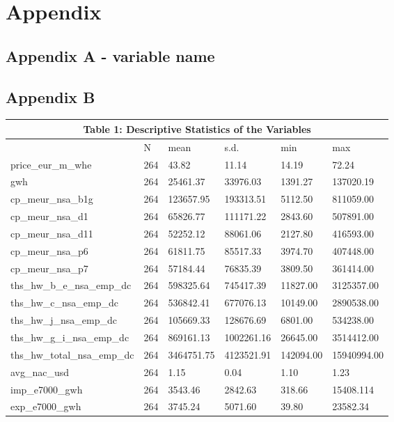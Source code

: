 \documentclass[12pt]{article}
\begin{document}
\section{Appendix}
\hypertarget{A}{}
\subsection{Appendix A - variable name}


\newpage

\subsection{Appendix B}
\begin{tabular}{ p{4.2cm} p{2cm} p{2cm} p{2cm} p{2cm} p{2cm}   }

 \multicolumn{6}{c}{Table 1: Descriptive Statistics of the Variables} \\
  \hline
  &N&mean&s.d.&min&max\\
 \hline
 price\_eur\_m\_whe&264&43.82&11.14&14.19&72.24\\
 gwh&264&25461.37&33976.03&1391.27&137020.19\\
cp\_meur\_nsa\_b1g&264&123657.95&193313.51&5112.50&811059.00\\
cp\_meur\_nsa\_d1&264&65826.77&111171.22&2843.60&507891.00\\
cp\_meur\_nsa\_d11&264&52252.12&88061.06&2127.80&416593.00\\
cp\_meur\_nsa\_p6&264&61811.75&85517.33&3974.70&407448.00\\
cp\_meur\_nsa\_p7&264&57184.44&76835.39&3809.50&361414.00\\
ths\_hw\_b\_e\_nsa\_emp\_dc&264&598325.64&745417.39&11827.00&3125357.00\\
ths\_hw\_c\_nsa\_emp\_dc&264&536842.41&677076.13&10149.00&2890538.00\\
ths\_hw\_j\_nsa\_emp\_dc&264&105669.33&128676.69&6801.00&534238.00\\
ths\_hw\_g\_i\_nsa\_emp\_dc&264&869161.13&1002261.16&26645.00&3514412.00\\
ths\_hw\_total\_nsa\_emp\_dc&264&3464751.75&4123521.91&142094.00&15940994.00\\
 avg\_nac\_usd&264&1.15&0.04&1.10&1.23\\
imp\_e7000\_gwh&264&3543.46&2842.63&318.66&15408.114\\
exp\_e7000\_gwh&264&3745.24&5071.60&39.80&23582.34\\
 \hline
\end{tabular}
\end{document}
